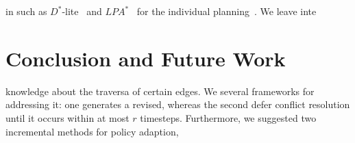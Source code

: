 \documentclass[letterpaper]{article} %
\def\
UrlFont{\rm}  %
\theoremstyle{definition}
\begin{document}
 in such as $D^*$-lite~\cite{koenig2002d} and $LPA^*$~\cite{koenig2004lifelong} for the individual planning~\cite{boyarski2021iterative}. We leave inte





\section{Conclusion and Future Work}

  knowledge about the traversa of certain edges. We  several frameworks for addressing it: one generates a  revised, whereas the second defer conflict resolution until it occurs within at most $r$ timesteps. Furthermore, we suggested two incremental methods for policy adaption,        

\clearpage

\end{document}
